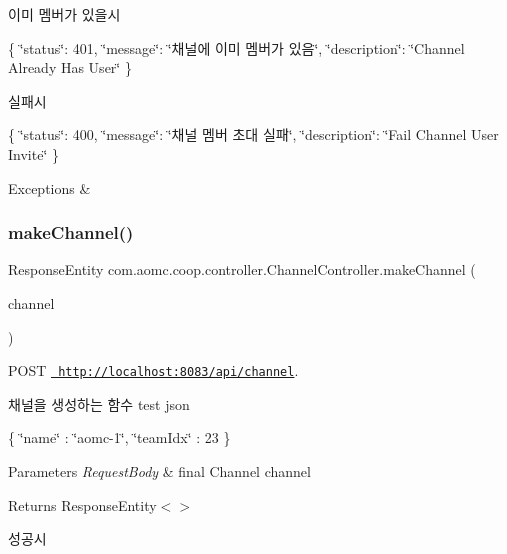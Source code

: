 이미 멤버가 있을시

\{ \char`\"{}status\char`\"{}\+: 401, \char`\"{}message\char`\"{}\+: \char`\"{}채널에 이미 멤버가 있음\char`\"{}, \char`\"{}description\char`\"{}\+: \char`\"{}\+Channel Already Has User\char`\"{} \}

실패시

\{ \char`\"{}status\char`\"{}\+: 400, \char`\"{}message\char`\"{}\+: \char`\"{}채널 멤버 초대 실패\char`\"{}, \char`\"{}description\char`\"{}\+: \char`\"{}\+Fail Channel User Invite\char`\"{} \}


\begin{DoxyExceptions}{Exceptions}
{\em } & \\
\hline
\end{DoxyExceptions}
\mbox{\label{classcom_1_1aomc_1_1coop_1_1controller_1_1_channel_controller_a6eec06a26ab08812025e22eb5e8005a9}} 
\subsubsection{\texorpdfstring{makeChannel()}{makeChannel()}}
{\footnotesize\ttfamily Response\+Entity com.\+aomc.\+coop.\+controller.\+Channel\+Controller.\+make\+Channel (\begin{DoxyParamCaption}\item[{@Request\+Body final Channel}]{channel }\end{DoxyParamCaption})}



P\+O\+ST \href{http://localhost:8083/api/channel}{\texttt{ http\+://localhost\+:8083/api/channel}}. 

채널을 생성하는 함수 test json

\{ \char`\"{}name\char`\"{} \+: \char`\"{}aomc-\/1\char`\"{}, \char`\"{}team\+Idx\char`\"{} \+: 23 \}


\begin{DoxyParams}{Parameters}
{\em Request\+Body} & final Channel channel\\
\hline
\end{DoxyParams}
\begin{DoxyReturn}{Returns}
Response\+Entity$<$$>$
\end{DoxyReturn}
성공시

